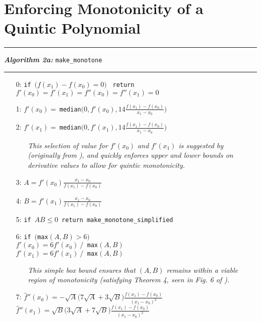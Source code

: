 \documentclass{article}
\begin{document}
\section{Enforcing Monotonicity of a Quintic Polynomial}


\vspace{10pt}
\hrule
\vspace{3pt}
\noindent\textbf{\textit{Algorithm 2a:}} \texttt{make\_monotone}
\vspace{3pt}
\hrule

\begin{itemize}
  \itemsep0pt
  \parskip0pt

\item[0:] \texttt{if }$\big(f(x_1) - f(x_0) = 0\big)$ \texttt{ return } $f'(x_0) = f'(x_1) = f''(x_0) = f''(x_1) = 0$
\item[1:] $f'(x_0) = \ $\texttt{median}$\big(0, f'(x_0), 14 \frac{f(x_1) - f(x_0)}{x_1 - x_0} \big)$
\item[2:] $f'(x_1) = \ $\texttt{median}$\big(0, f'(x_1), 14 \frac{f(x_1) - f(x_0)}{x_1 - x_0}\big)$
  \begin{itemize}
  \item[] \textit{This selection of value for $f'(x_0)$ and $f'(x_1)$ is suggested by \cite{ulrich1994positivity} (originally from \cite{huynh1993accurate}), and quickly enforces upper and lower bounds on derivative values to allow for quintic monotonicity.}
  \end{itemize}
\item[3:] $A = f'(x_0)\frac{x_1 - x_0}{f(x_1) - f(x_0)}$
\item[4:] $B = f'(x_1) \frac{x_1 - x_0}{f(x_1) - f(x_0)}$
\item[5:] \texttt{if }$AB \leq 0$\texttt{ return make\_monotone\_simplified}
\item[6:] \texttt{if $\big($max}$(A,B) > 6\big)$\\$f'(x_0) = 6 f'(x_0)\  /$\texttt{ max}$(A,B)$\\$f'(x_1) = 6 f'(x_1)\  /$\texttt{ max}$(A,B)$

  \begin{itemize}
  \item[] \textit{This simple box bound ensures that $(A,B)$ remains within a viable region of monotonicity (satisfying Theorem 4, seen in Fig. 6 of \cite{ulrich1994positivity}).}
  \end{itemize}

\item[7:] $\hat f''(x_0) = - \sqrt{A} \big( 7 \sqrt{A} + 3 \sqrt{B} \big) \frac{f(x_1) - f(x_0)}{(x_1 - x_0)^2}$\\$\hat f''(x_1) = \sqrt{B} \big( 3 \sqrt{A} + 7 \sqrt{B} \big) \frac{f(x_1) - f(x_0)}{(x_1 - x_0)^2}$


\end{itemize}
\end{document}
